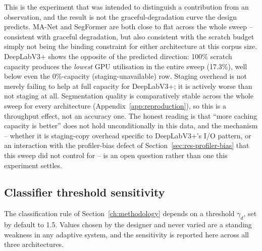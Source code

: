 This is the experiment that was intended to distinguish a contribution from an
observation, and the result is not the graceful-degradation curve the design
predicts. MA-Net and SegFormer are both close to flat across the whole sweep --
consistent with graceful degradation, but also consistent with the scratch
budget simply not being the binding constraint for either architecture at this
corpus size. DeepLabV3+ shows the opposite of the predicted direction: 100\%
scratch capacity produces the \emph{lowest} GPU utilisation in the entire sweep
(17.3\%), well below even the 0\%-capacity (staging-unavailable) row. Staging
overhead is not merely failing to help at full capacity for DeepLabV3+; it is
actively worse than not staging at all. Segmentation quality is comparatively
stable across the whole sweep for every architecture
(Appendix~\ref{app:reproduction}), so this is a throughput effect, not an
accuracy one. The honest reading is that ``more caching capacity is better''
does not hold unconditionally in this data, and the mechanism -- whether it is
staging-copy overhead specific to DeepLabV3+'s I/O pattern, or an interaction
with the profiler-bias defect of Section~\ref{sec:res-profiler-bias} that this
sweep did not control for -- is an open question rather than one this experiment
settles.


\subsection{Classifier threshold sensitivity}
\label{sec:ablation-thresholds}

The classification rule of Section~\ref{ch:methodology} depends on a threshold
$\gamma_d$, set by default to 1.5. Values chosen by the designer and never
varied are a standing weakness in any adaptive system, and the sensitivity is
reported here across all three architectures.

